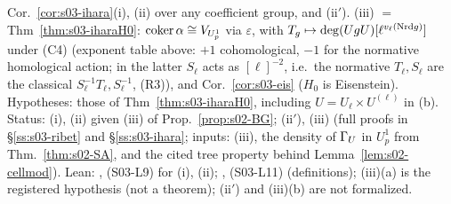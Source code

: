 \begin{interface}\label{if:s03-ihara}
Cor.~\ref{cor:s03-ihara}(i), (ii) over any coefficient group, and (ii$'$). (iii) $=$ Thm~\ref{thm:s03-iharaH0}: $\operatorname{coker}\alpha\cong
V_{U^1_p}$ via $\varepsilon$, with $T_g\mapsto\deg(UgU)[\ell^{v_\ell(\mathrm{Nrd} g)}]$ under (C4) (exponent table above: $+1$ cohomological, $-1$ for the normative
homological action; in the latter $S_\ell$ acts as $[\ell]^{-2}$, i.e.\ the normative $T_\ell,S_\ell$ are the classical $S_\ell^{-1}T_\ell,S_\ell^{-1}$, (R3)), and Cor.~\ref{cor:s03-eis} ($H_0$ is Eisenstein). Hypotheses: those of Thm~\ref{thm:s03-iharaH0}, including $U=U_\ell\times U^{(\ell)}$ in (b). Status: (i), (ii) \stproved{} given (iii) of Prop.~\ref{prop:s02-BG}; (ii$'$), (iii)
\stpmc{} (full proofs in \S\ref{ss:s03-ribet} and \S\ref{ss:s03-ihara}; inputs: (iii), the density of $\Gamma_U$ in $U^1_p$ from Thm.~\ref{thm:s02-SA}, and the
cited tree property behind Lemma~\ref{lem:s02-cellmod}). Lean: ,  (S03-L9) \stformal{} for (i), (ii); ,  (S03-L11) \stformal{} (definitions);
(iii)(a) is the registered hypothesis  (not a theorem); (ii$'$) and (iii)(b) are not formalized.
\end{interface}

